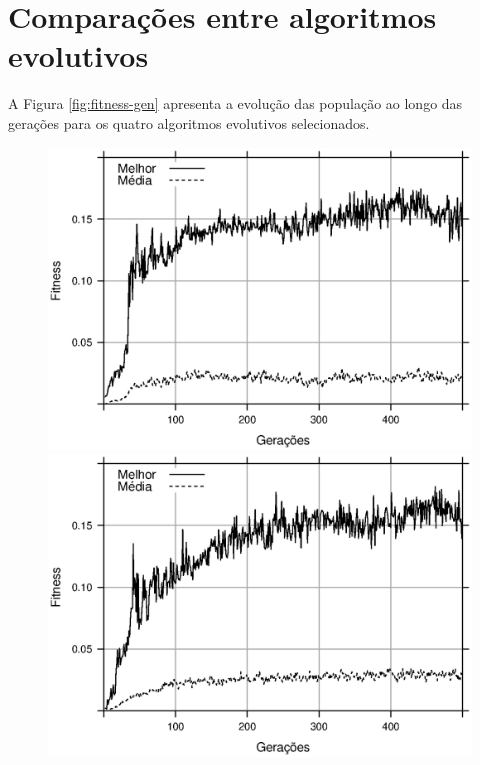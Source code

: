 \section{Comparações entre algoritmos evolutivos}

A Figura \ref{fig:fitness-gen} apresenta a evolução das população ao longo das gerações para os quatro algoritmos evolutivos selecionados.

\begin{figure}[h]
    \centering
    \begin{minipage}{.5\textwidth}
        \includegraphics[width=\textwidth]{figures/fitness-GA}
    \end{minipage}%
    \begin{minipage}{.5\textwidth}
        \includegraphics[width=\textwidth]{figures/fitness-PGA}
    \end{minipage}


\end{figure}
